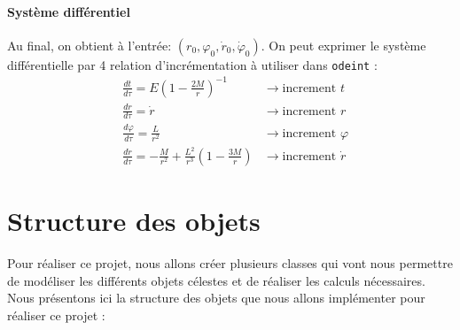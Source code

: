 \documentclass{article}
\begin{document}
\paragraph{Système différentiel} 
Au final, on obtient à l'entrée: $(r_0,\varphi_0,\dot r_0, \dot \varphi_0)$. On peut exprimer le système différentielle par 4 relation d'incrémentation à utiliser dans \texttt{odeint} : 
\begin{align*}
&\frac{dt}{d\tau}=E\left(1-\frac{2M}{r}\right)^{-1}&\to\text{increment } t\\
&\frac{dr}{d\tau}=\dot r&\to\text{increment } r\\
&\frac{d\varphi}{d\tau}=\frac{L}{r^2}&\to\text{increment }\varphi\\
&\frac{d\dot r}{d\tau}=-\frac{M}{r^2}+\frac{L^2}{r^3}\left(1-\frac{3M}{r}\right)&\to\text{increment } \dot r
\end{align*}
\newpage
\section{Structure des objets}

Pour réaliser ce projet, nous allons créer plusieurs classes qui vont nous permettre de modéliser les différents objets célestes et de réaliser les calculs nécessaires. \\

Nous présentons ici la structure des objets que nous allons implémenter pour réaliser ce projet :
\end{document}
